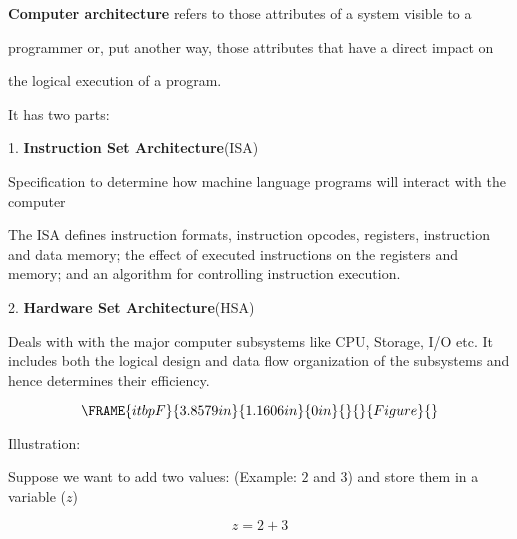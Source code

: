 \documentclass{article}
\begin{document}
\textbf{Computer architecture} refers to those attributes of a system
visible to a

programmer or, put another way, those attributes that have a direct impact on

the logical execution of a program.

\bigskip

It has two parts:

1. \textbf{Instruction Set Architecture}(ISA)

\qquad Specification to determine how machine language programs will
interact with the computer

The ISA defines instruction formats, instruction opcodes, registers,
instruction and data memory; the effect of executed instructions on the
registers and memory; and an algorithm for controlling instruction execution.

2. \textbf{Hardware Set Architecture}(HSA)

\qquad Deals with with the major computer subsystems like CPU, Storage, I/O
etc. It includes both the logical design and data flow organization of the
subsystems and hence determines their efficiency.

\bigskip

\[
\FRAME{itbpF}{3.8579in}{1.1606in}{0in}{}{}{Figure}{\special{language
"Scientific Word";type "GRAPHIC";display "USEDEF";valid_file "T";width
3.8579in;height 1.1606in;depth 0in;original-width 16.5387in;original-height
3.9704in;cropleft "0";croptop "1";cropright "1";cropbottom "0";tempfilename
'SDACVL05.bmp';tempfile-properties "XPR";}} 
\]

\bigskip

Illustration:

\bigskip

Suppose we want to add two values: (Example: $2$ and $3$) and store them in
a variable ($z$)

\[
z=2+3 
\]

\bigskip
\end{document}
